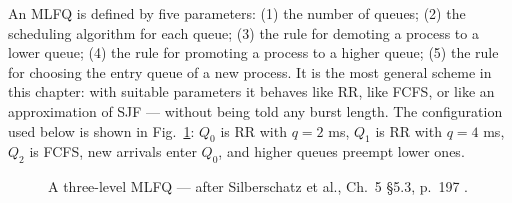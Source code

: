 \documentclass[11pt]{article}
\begin{document}
An MLFQ is defined by five parameters: (1) the number of queues; (2) the scheduling algorithm for each queue; (3) the rule for demoting a process to a lower queue; (4) the rule for promoting a process to a higher queue; (5) the rule for choosing the entry queue of a new process. It is the most general scheme in this chapter: with suitable parameters it behaves like RR, like FCFS, or like an approximation of SJF --- without being told any burst length. The configuration used below is shown in Fig.~\ref{fig:mlfq}: $Q_0$ is RR with $q=2$ ms, $Q_1$ is RR with $q=4$ ms, $Q_2$ is FCFS, new arrivals enter $Q_0$, and higher queues preempt lower ones.

\begin{figure}[h]
\centering
\caption{A three-level MLFQ --- after Silberschatz et al., Ch.~5 \S5.3, p.~197 \cite{SilberschatzOSC_operating_system_concepts}.}
\label{fig:mlfq}
\end{figure}
\end{document}

